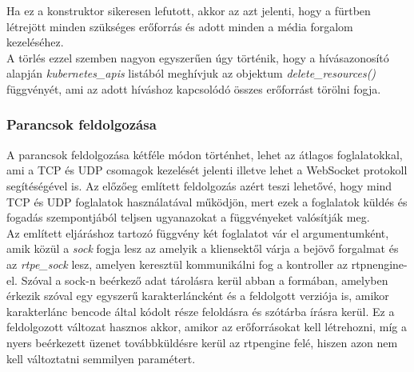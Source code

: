 Ha ez a konstruktor sikeresen lefutott, akkor az azt jelenti, hogy a fürtben létrejött
minden szükséges erőforrás és adott minden a média forgalom kezeléséhez. \\

A törlés ezzel szemben nagyon egyszerűen úgy történik, hogy a hívásazonosító alapján
\textit{kubernetes\_apis} listából meghívjuk az objektum \textit{delete\_resources()}
függvényét, ami az adott híváshoz kapcsolódó összes erőforrást törölni fogja.

\subsubsection{Parancsok feldolgozása}

A parancsok feldolgozása kétféle módon történhet, lehet az átlagos foglalatokkal, ami 
a TCP és UDP csomagok kezelését jelenti illetve lehet a WebSocket protokoll segítéségével 
is. Az előzőeg említett feldolgozás azért teszi lehetővé, hogy mind TCP és UDP
foglalatok használatával működjön, mert ezek a foglalatok küldés és fogadás szempontjából
teljsen ugyanazokat a függvényeket valósítják meg. \\

Az említett eljáráshoz tartozó függvény két foglalatot vár el argumentumként, amik közül 
a \textit{sock} fogja lesz az amelyik a kliensektől várja a bejövő forgalmat és az 
\textit{rtpe\_sock} lesz, amelyen keresztül kommunikálni fog a kontroller az rtpnengine-el. 
Szóval a sock-n beérkező adat tárolásra kerül abban a formában, amelyben érkezik szóval 
egy egyszerű karakterláncként és a feldolgott verziója is, amikor karakterlánc bencode 
által kódolt része feloldásra és szótárba írásra kerül. Ez a feldolgozott változat hasznos 
akkor, amikor az erőforrásokat kell létrehozni, míg a nyers beérkezett üzenet továbbküldésre 
kerül az rtpengine felé, hiszen azon nem kell változtatni semmilyen paramétert.

